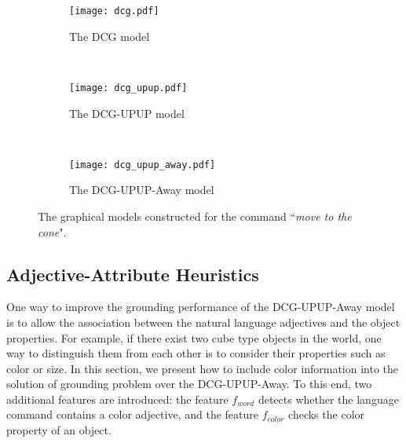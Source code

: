\begin{figure*}
\centering
\begin{subfigure}[t]{0.235\textwidth}
\centering
\texttt{[image: dcg.pdf]}
\caption{The DCG model}
\label{fig:dcg}
\end{subfigure}
~
\begin{subfigure}[t]{0.31\textwidth}
\centering
\texttt{[image: dcg\_upup.pdf]}
\caption{The DCG-UPUP model}
\label{fig:dcg-upup}
\end{subfigure}
~
\begin{subfigure}[t]{0.4\textwidth}
\centering
\texttt{[image: dcg\_upup\_away.pdf]}
\caption{The DCG-UPUP-Away model}
\label{fig:dcg-upup-away}
\end{subfigure}
\caption{The graphical models constructed for the command ``\emph{move to the cone}".}
\end{figure*}

\subsection{Adjective-Attribute Heuristics}
\label{sec:color}
One way to improve the grounding performance of the DCG-UPUP-Away model is to allow the association between the natural language adjectives and the object properties. For example, if there exist two cube type objects in the world, one way to distinguish them from each other is to consider their properties such as color or size. In this section, we present how to include color information into the solution of grounding problem over the DCG-UPUP-Away. To this end, two additional features are introduced: the feature $f_{word}$ detects whether the language command contains a color adjective, and the feature $f_{color}$ checks the color property of an object.     

